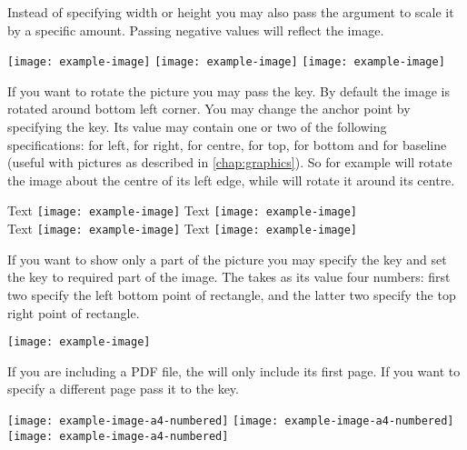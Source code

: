 Instead of specifying width or height you may also pass the 
argument to scale it by a specific amount. Passing negative values will
reflect the image.
\begin{example}[examplewidth=0.6\linewidth]
\texttt{[image: example-image]}
\texttt{[image: example-image]}
\texttt{[image: example-image]}
\vspace{1.3cm}
\end{example}

If you want to rotate the picture you may pass the  key. By
default the image is rotated around bottom left corner. You may change the
anchor point by specifying the  key. Its value may contain one or
two of the following specifications:  for left,  for right,
 for centre,  for top,  for bottom and  for
baseline (useful with \TikZ{} pictures as described in
\autoref{chap:graphics}). So for example  will rotate the image
about the centre of its left edge, while  will rotate it around its
centre.
\begin{example}
Text \texttt{[image: example-image]}
Text \texttt{[image: example-image]}  \\
Text \texttt{[image: example-image]}
Text \texttt{[image: example-image]}
\end{example}

If you want to show only a part of the picture you may specify the
 key and set the  key to required part of the
image. The  takes as its value four numbers: first two specify
the left bottom point of rectangle, and the latter two specify the top right
point of rectangle.
\begin{example}
\texttt{[image: example-image]}
\end{example}

If you are including a PDF file, the  will only include its
first page. If you want to specify a different page pass it to the 
key.
\begin{example}
\texttt{[image: example-image-a4-numbered]}
\texttt{[image: example-image-a4-numbered]}
\texttt{[image: example-image-a4-numbered]}
\end{example}


